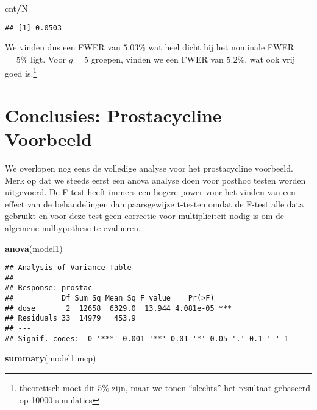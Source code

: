 \documentclass[12pt,dutch,coursenotes]{book}
\newenvironment{Shaded}{\begin{snugshade}}{\end{snugshade}}
\newcommand{\KeywordTok}[1]{\textcolor[rgb]{0.13,0.29,0.53}{\textbf{#1}}}
\newcommand{\OperatorTok}[1]{\textcolor[rgb]{0.81,0.36,0.00}{\textbf{#1}}}
\newcommand{\NormalTok}[1]{#1}
\let\rmarkdownfootnote\footnote%
\def\footnote{\protect\rmarkdownfootnote}
\theoremstyle{definition}
\theoremstyle{definition}
\theoremstyle{definition}
\theoremstyle{remark}
\begin{document}
\begin{Shaded}
\begin{Highlighting}[]
\NormalTok{cnt}\OperatorTok{/}\NormalTok{N}
\end{Highlighting}
\end{Shaded}

\begin{verbatim}
## [1] 0.0503
\end{verbatim}

We vinden dus een FWER van \(5.03\%\) wat heel dicht hij het nominale
FWER\(=5\%\) ligt. Voor \(g=5\) groepen, vinden we een FWER van
\(5.2\%\), wat ook vrij goed is.\footnote{theoretisch moet dit \(5\%\)
  zijn, maar we tonen ``slechts'' het resultaat gebaseerd op 10000
  simulaties}

\section{Conclusies: Prostacycline
Voorbeeld}\label{conclusies-prostacycline-voorbeeld}

We overlopen nog eens de volledige analyse voor het prostacycline
voorbeeld. Merk op dat we steeds eerst een anova analyse doen voor
posthoc testen worden uitgevoerd. De F-test heeft immers een hogere
power voor het vinden van een effect van de behandelingen dan
paarsgewijze t-testen omdat de F-test alle data gebruikt en voor deze
test geen correctie voor multipliciteit nodig is om de algemene
nulhypothese te evalueren.

\begin{Shaded}
\begin{Highlighting}[]
\KeywordTok{anova}\NormalTok{(model1)}
\end{Highlighting}
\end{Shaded}

\begin{verbatim}
## Analysis of Variance Table
## 
## Response: prostac
##           Df Sum Sq Mean Sq F value    Pr(>F)    
## dose       2  12658  6329.0  13.944 4.081e-05 ***
## Residuals 33  14979   453.9                      
## ---
## Signif. codes:  0 '***' 0.001 '**' 0.01 '*' 0.05 '.' 0.1 ' ' 1
\end{verbatim}

\begin{Shaded}
\begin{Highlighting}[]
\KeywordTok{summary}\NormalTok{(model1.mcp)}
\end{Highlighting}
\end{Shaded}
\end{document}

